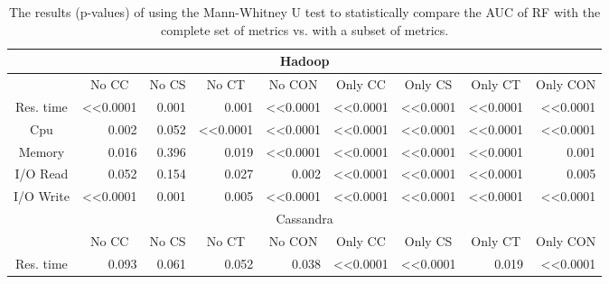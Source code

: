 \begin{table}
\tabcolsep=0.05cm
\footnotesize
\caption{The results (p-values) of using the Mann-Whitney U test to statistically compare the AUC of RF with the complete set of metrics vs. with a subset of metrics.}
    \begin{tabular}{|c|r|r|r|r|r|r|r|r|}
    \hline
    \multicolumn{9}{|c|}{Hadoop}                 \\ \hline
              & \multicolumn{1}{c|}{No   CC} & \multicolumn{1}{c|}{No   CS} & \multicolumn{1}{c|}{No CT}   & \multicolumn{1}{c|}{No   CON} & \multicolumn{1}{c|}{Only   CC} & \multicolumn{1}{c|}{Only  CS} & \multicolumn{1}{c|}{Only  CT} & \multicolumn{1}{c|}{Only  CON} \\ \hline
    Res. time & \textless{}\textless{}0.0001 & 0.001  & 0.001  & \textless{}\textless{}0.0001  & \textless{}\textless{}0.0001   & \textless{}\textless{}0.0001  & \textless{}\textless{}0.0001  & \textless{}\textless{}0.0001   \\ \hline
    Cpu       & 0.002  & 0.052  & \textless{}\textless{}0.0001 & \textless{}\textless{}0.0001  & \textless{}\textless{}0.0001   & \textless{}\textless{}0.0001  & \textless{}\textless{}0.0001  & \textless{}\textless{}0.0001   \\ \hline
    Memory    & 0.016  & 0.396  & 0.019  & \textless{}\textless{}0.0001  & \textless{}\textless{}0.0001   & \textless{}\textless{}0.0001  & \textless{}\textless{}0.0001  & 0.001    \\ \hline
    I/O Read  & 0.052  & 0.154  & 0.027  & 0.002   & \textless{}\textless{}0.0001   & \textless{}\textless{}0.0001  & \textless{}\textless{}0.0001  & 0.005    \\ \hline
    I/O Write & \textless{}\textless{}0.0001 & 0.001  & 0.005  & \textless{}\textless{}0.0001  & \textless{}\textless{}0.0001   & \textless{}\textless{}0.0001  & \textless{}\textless{}0.0001  & \textless{}\textless{}0.0001   \\ \hline
    \multicolumn{9}{|c|}{Cassandra}              \\ \hline
              & \multicolumn{1}{c|}{No   CC} & \multicolumn{1}{c|}{No   CS} & \multicolumn{1}{c|}{No CT}   & \multicolumn{1}{c|}{No   CON} & \multicolumn{1}{c|}{Only   CC} & \multicolumn{1}{c|}{Only  CS} & \multicolumn{1}{c|}{Only  CT} & \multicolumn{1}{c|}{Only  CON} \\ \hline
    Res. time & 0.093  & 0.061  & 0.052  & 0.038   & \textless{}\textless{}0.0001   & \textless{}\textless{}0.0001  & 0.019   & \textless{}\textless{}0.0001   \\ \hline

\end{tabular}
\end{table}
